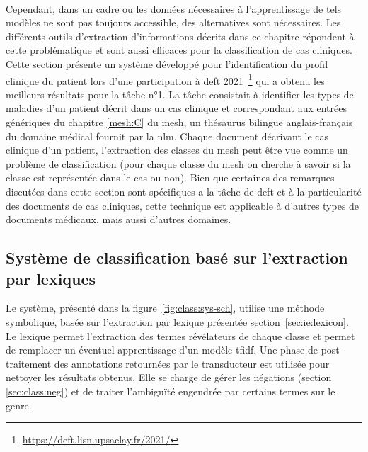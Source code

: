 \paragraph{}
Cependant, dans un cadre ou les données nécessaires à l'apprentissage de tels modèles ne sont pas toujours accessible, des alternatives sont nécessaires.
Les différents outils d'extraction d'informations décrits dans ce chapitre répondent à cette problématique et sont aussi efficaces pour la classification de cas cliniques.
Cette section présente un système développé pour l'identification du profil clinique du patient \cite{hiotDOINGDEFTUtilisation2021} lors d'une participation à \gls{deft} 2021~\footnote{\url{https://deft.lisn.upsaclay.fr/2021/}} \cite{grouinClassificationCasCliniques2021} qui a obtenu les meilleurs résultats pour la tâche n°1.
La tâche consistait à identifier les types de maladies d'un patient décrit dans un cas clinique et correspondant aux entrées génériques du chapitre \ref{mesh:C} du \gls{mesh}, un thésaurus bilingue anglais-français du domaine médical fournit par la \gls{nlm}.
Chaque document décrivant le cas clinique d'un patient, l'extraction des classes du \gls{mesh} peut être vue comme un problème de classification (pour chaque classe du \gls{mesh} on cherche à savoir si la classe est représentée dans le cas ou non).
Bien que certaines des remarques discutées dans cette section sont spécifiques a la tâche de \gls{deft} et à la particularité des documents de cas cliniques, cette technique est applicable à d'autres types de documents médicaux, mais aussi d'autres domaines.

\subsection{Système de classification basé sur l'extraction par lexiques}
Le système, présenté dans la figure~\ref{fig:class:sys-sch}, utilise une méthode symbolique, basée sur l'extraction par lexique présentée section~\ref{sec:ie:lexicon}.
Le lexique permet l'extraction des termes révélateurs de chaque classe et permet de remplacer un éventuel apprentissage d'un modèle \gls{tfidf}.
Une phase de post-traitement des annotations retournées par le transducteur est utilisée pour nettoyer les résultats obtenus.
Elle se charge de gérer les négations (section \ref{sec:class:neg}) et de traiter l'ambiguïté engendrée par certains termes sur le genre.

